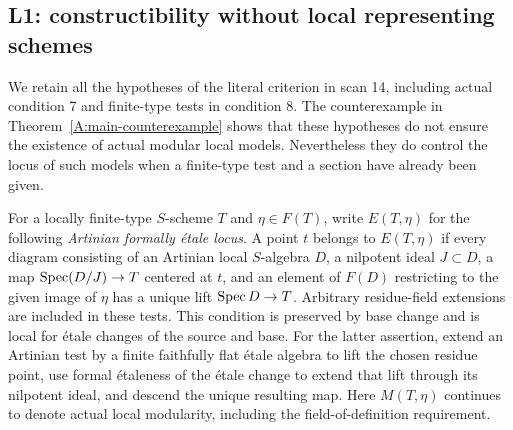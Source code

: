 \subsection{L1: constructibility without local representing schemes}

We retain all the hypotheses of the literal criterion in scan 14,
including actual condition 7 and finite-type tests in condition 8.
The counterexample in Theorem~\ref{A:main-counterexample} shows that
these hypotheses do not ensure the existence of actual modular local
models.  Nevertheless they do control the locus of such models when
a finite-type test and a section have already been given.

For a locally finite-type $S$-scheme $T$ and $\eta\in F(T)$,
write $E(T,\eta)$ for the following \emph{Artinian formally
\'etale locus}.  A point $t$ belongs to $E(T,\eta)$ if every
diagram consisting of an Artinian local $S$-algebra $D$, a nilpotent
ideal $J\subset D$, a map $\operatorname{Spec}(D/J)\to T$ centered at $t$,
and an element of $F(D)$ restricting to the given image of $\eta$
has a unique lift $\operatorname{Spec} D\to T$.  Arbitrary residue-field
extensions are included in these tests.  This condition is preserved
by base change and is local for \'etale changes of the source and
base.  For the latter assertion, extend an Artinian test by a finite
faithfully flat \'etale algebra to lift the chosen residue point,
use formal \'etaleness of the \'etale change to extend that lift
through its nilpotent ideal, and descend the unique resulting map.
Here $M(T,\eta)$ continues to denote actual local modularity,
including the field-of-definition requirement.

